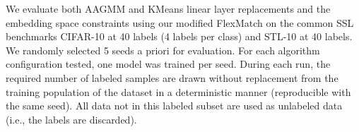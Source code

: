 \documentclass[10pt,twocolumn,letterpaper]{article}
\begin{document}
We evaluate both AAGMM and KMeans linear layer replacements and the embedding space constraints using our modified FlexMatch \cite{zhang2021flexmatch} on the common SSL benchmarks CIFAR-10 \cite{cifar10} at 40 labels (4 labels per class) and STL-10 \cite{coates2011analysis} at 40 labels. 
We randomly selected 5 seeds a priori for evaluation.
For each algorithm configuration tested, one model was trained per seed.
During each run, the required number of labeled samples are drawn without replacement from the training population of the dataset in a deterministic manner (reproducible with the same seed).
All data not in this labeled subset are used as unlabeled data (i.e., the labels are discarded).



\end{document}
